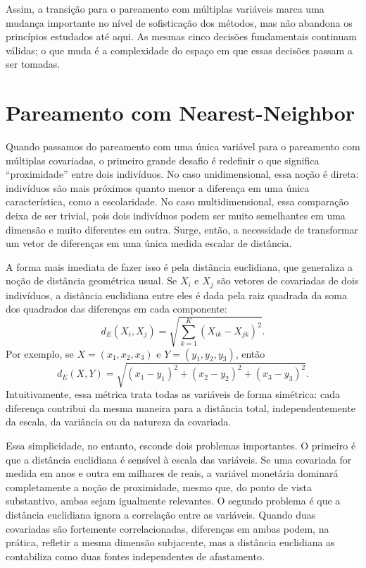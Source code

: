 Assim, a transição para o pareamento com múltiplas variáveis marca uma mudança importante no nível de sofisticação dos métodos, mas não abandona os princípios estudados até aqui. As mesmas cinco decisões fundamentais continuam válidas; o que muda é a complexidade do espaço em que essas decisões passam a ser tomadas.


\section{Pareamento com Nearest-Neighbor}

Quando passamos do pareamento com uma única variável para o pareamento com múltiplas covariadas, o primeiro grande desafio é redefinir o que significa “proximidade” entre dois indivíduos. No caso unidimensional, essa noção é direta: indivíduos são mais próximos quanto menor a diferença em uma única característica, como a escolaridade. No caso multidimensional, essa comparação deixa de ser trivial, pois dois indivíduos podem ser muito semelhantes em uma dimensão e muito diferentes em outra. Surge, então, a necessidade de transformar um vetor de diferenças em uma única medida escalar de distância.

A forma mais imediata de fazer isso é pela distância euclidiana, que generaliza a noção de distância geométrica usual. Se $X_i$ e $X_j$ são vetores de covariadas de dois indivíduos, a distância euclidiana entre eles é dada pela raiz quadrada da soma dos quadrados das diferenças em cada componente:
\[
d_E(X_i, X_j)
=
\sqrt{
\sum_{k=1}^K (X_{ik} - X_{jk})^2
}.
\]
Por exemplo, se $X = (x_1, x_2, x_3)$ e $Y = (y_1, y_2, y_3)$, então
\[
d_E(X, Y)
=
\sqrt{
(x_1 - y_1)^2
+
(x_2 - y_2)^2
+
(x_3 - y_3)^2
}.
\]
Intuitivamente, essa métrica trata todas as variáveis de forma simétrica: cada diferença contribui da mesma maneira para a distância total, independentemente da escala, da variância ou da natureza da covariada.



Essa simplicidade, no entanto, esconde dois problemas importantes. O primeiro é que a distância euclidiana é sensível à escala das variáveis. Se uma covariada for medida em anos e outra em milhares de reais, a variável monetária dominará completamente a noção de proximidade, mesmo que, do ponto de vista substantivo, ambas sejam igualmente relevantes. O segundo problema é que a distância euclidiana ignora a correlação entre as variáveis. Quando duas covariadas são fortemente correlacionadas, diferenças em ambas podem, na prática, refletir a mesma dimensão subjacente, mas a distância euclidiana as contabiliza como duas fontes independentes de afastamento.

